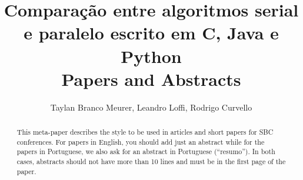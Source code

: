 \documentclass[12pt]{article}
\title{Comparação entre algoritmos serial e paralelo escrito em C, Java e Python\\ Papers and Abstracts}
\author{Taylan Branco Meurer\inst{1}, Leandro Loffi\inst{1}, Rodrigo Curvello\inst{2}}
\begin{document}
 

\maketitle

\begin{abstract}
  This meta-paper describes the style to be used in articles and short papers
  for SBC conferences. For papers in English, you should add just an abstract
  while for the papers in Portuguese, we also ask for an abstract in
  Portuguese (``resumo''). In both cases, abstracts should not have more than
  10 lines and must be in the first page of the paper.
\end{abstract}
\end{document}
